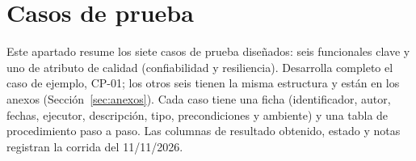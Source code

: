 \section{Casos de prueba}
\label{sec:casos}

Este apartado resume los siete casos de prueba diseñados: seis funcionales clave y uno de atributo de calidad (confiabilidad y resiliencia). Desarrolla completo el caso de ejemplo, CP-01; los otros seis tienen la misma estructura y están en los anexos (Sección~\ref{sec:anexos}). Cada caso tiene una ficha (identificador, autor, fechas, ejecutor, descripción, tipo, precondiciones y ambiente) y una tabla de procedimiento paso a paso. Las columnas de resultado obtenido, estado y notas registran la corrida del 11/11/2026.

\newcommand{\FichaCasoAux}[1]{%
\begin{table}[H]
\centering
\small
\renewcommand{\arraystretch}{1.18}
\setlength{\tabcolsep}{4pt}
\begin{tabularx}{\textwidth}{|>{\raggedright\arraybackslash}p{2.55cm}|>{\raggedright\arraybackslash}X|>{\raggedright\arraybackslash}p{2.55cm}|>{\raggedright\arraybackslash}X|}
\hline
\textbf{Id:} & \FichaId & \textbf{Autor:} & \FichaAutor \\ \hline
\textbf{Fecha de creación:} & \FichaFechaCreacion & \textbf{Título:} & \FichaTitulo \\ \hline
\textbf{Ejecutor:} & \FichaEjecutor & \textbf{Fecha de ejecución:} & \FichaFechaEjecucion \\ \hline
\multicolumn{4}{|l|}{\textbf{Descripción:}} \\ \hline
\multicolumn{4}{|>{\raggedright\arraybackslash}p{\dimexpr\textwidth-2\tabcolsep-2\arrayrulewidth\relax}|}{\FichaDescripcion} \\ \hline
\multicolumn{4}{|>{\raggedright\arraybackslash}p{\dimexpr\textwidth-2\tabcolsep-2\arrayrulewidth\relax}|}{\textbf{Tipo:} \FichaTipo} \\ \hline
\multicolumn{4}{|l|}{\textbf{Precondiciones:}} \\ \hline
\multicolumn{4}{|>{\raggedright\arraybackslash}p{\dimexpr\textwidth-2\tabcolsep-2\arrayrulewidth\relax}|}{\FichaPrecondiciones} \\ \hline
\multicolumn{4}{|l|}{\textbf{Ambiente:}} \\ \hline
\multicolumn{4}{|>{\raggedright\arraybackslash}p{\dimexpr\textwidth-2\tabcolsep-2\arrayrulewidth\relax}|}{#1} \\ \hline
\end{tabularx}
\caption{Ficha del caso \FichaId}
\end{table}
}

